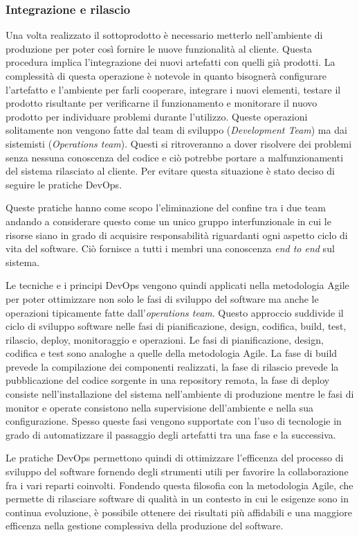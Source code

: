 \subsubsection{Integrazione e rilascio}
Una volta realizzato il sottoprodotto è necessario metterlo nell'ambiente di produzione per poter così fornire le nuove funzionalità al cliente.
Questa procedura implica l'integrazione dei nuovi artefatti con quelli già prodotti.
La complessità di questa operazione è notevole in quanto bisognerà configurare l'artefatto e l'ambiente per farli cooperare, integrare i nuovi elementi, testare il prodotto risultante
per verificarne il funzionamento e monitorare il nuovo prodotto per individuare problemi durante l'utilizzo.
Queste operazioni solitamente non vengono fatte dal team di sviluppo (\textit{Development Team}) ma dai sistemisti (\textit{Operations team}).
Questi si ritroveranno a dover risolvere dei problemi senza nessuna conoscenza del codice e ciò potrebbe portare a malfunzionamenti del sistema rilasciato al cliente.
Per evitare questa situazione è stato deciso di seguire le pratiche DevOps.

Queste pratiche hanno come scopo l'eliminazione del confine tra i due team andando a considerare questo come un unico gruppo interfunzionale in cui le risorse
siano in grado di acquisire responsabilità riguardanti ogni aspetto ciclo di vita del software. Ciò fornisce a tutti i membri
una conoscenza \textit{end to end} sul sistema.

Le tecniche e i principi DevOps vengono quindi applicati nella metodologia Agile per poter ottimizzare non solo le fasi di sviluppo del software ma
anche le operazioni tipicamente fatte dall'\textit{operations team}.
Questo approccio suddivide il ciclo di sviluppo software nelle fasi di pianificazione, design, codifica, build, test, rilascio, deploy, monitoraggio e operazioni.
Le fasi di pianificazione, design,  codifica e test sono analoghe a quelle della metodologia Agile. La fase di build prevede la compilazione dei componenti realizzati,
la fase di rilascio prevede la pubblicazione del codice sorgente in una repository remota, la fase di deploy consiste nell'installazione del sistema nell'ambiente di produzione
mentre le fasi di monitor e operate consistono nella supervisione dell'ambiente e nella sua configurazione.
Spesso queste fasi vengono supportate con l'uso di tecnologie in grado di automatizzare il passaggio degli artefatti tra una fase e la successiva.

Le pratiche DevOps permettono quindi di ottimizzare l'efficenza del processo di sviluppo del software fornendo degli strumenti utili per favorire la collaborazione fra i vari reparti coinvolti.
Fondendo questa filosofia con la metodologia Agile, che permette di rilasciare software di qualità in un contesto in cui le esigenze sono in continua evoluzione,
è possibile ottenere dei risultati più affidabili e una maggiore efficenza nella gestione complessiva della produzione del software.

